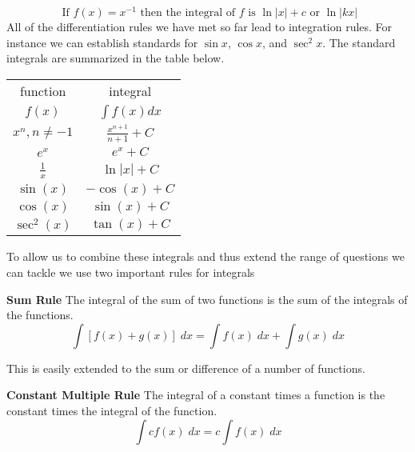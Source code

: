 \begin{equation*}\text{ If }f (x) =x^{ -1}\text{ then the integral of }f\text{ is }\ln  \left \vert x\right \vert  +c\text{ or }\ln  \left \vert k x\right \vert
\end{equation*}
All of the differentiation rules we have met so far lead to integration rules. For instance we can establish standards for $\sin  x$, $\cos  x$, and $\sec ^{2} x\text{.}$ The standard integrals are summarized in the table below.
\renewcommand\arraystretch{1.5}
\begin{center}
	\begin{tabular}{cc}
		\toprule
		function&integral\\
		$f(x)$  &  $\int f(x)dx$ \\ \midrule
		$x^n, n \neq -1$ & $\frac{x^{n+1}}{n+1}+C$\\ 
		$e^x$ & $e^x+C$\\ 
		$\frac{1}{x}$ & $\ln|x|+C$\\ 
		$\sin(x)$ & $-\cos(x)+C$ \\ 
		$\cos(x)$ & $\sin(x)+C$ \\ 
		$\sec^2(x)$ & $\tan(x)+C$ \\ \bottomrule
	\end{tabular}
\end{center}

To allow us to combine these integrals and thus extend the range of questions we can tackle we use two important rules for integrals 
\begin{tcolorbox}
\textbf{Sum Rule} The integral of the sum of two functions is the sum of the integrals of the functions.
\[\int \left [f (x) +g (x)\right ]\; d x =\int f (x)\; d x +\int g (x)\; d x\]
\end{tcolorbox}
This is easily extended to the sum or difference of a number of functions. 
\begin{tcolorbox}
\textbf{Constant Multiple Rule} The integral of a constant times a function is the constant times the integral of the function.
\[\int c f (x)\; d x =c \int f (x)\; d x
\]\end{tcolorbox}

